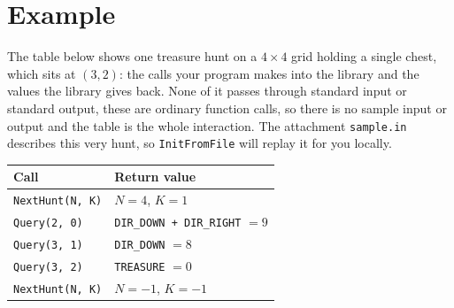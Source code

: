 \section*{Example}
The table below shows one treasure hunt on a $4 \times 4$ grid holding a single
chest, which sits at $(3, 2)$: the calls your program makes into the library and
the values the library gives back. None of it passes through standard input or
standard output, these are ordinary function calls, so there is no sample input or
output and the table is the whole interaction. The attachment \texttt{sample.in}
describes this very hunt, so \texttt{InitFromFile} will replay it for you locally.

\begin{center}
\begin{tabular}{| l | l |}
  \hline
  \textbf{Call} & \textbf{Return value} \\ \hline
  \texttt{NextHunt(N, K)} & $N = 4$, $K = 1$ \\ \hline
  \texttt{Query(2, 0)}    & \texttt{DIR\_DOWN + DIR\_RIGHT} $= 9$ \\ \hline
  \texttt{Query(3, 1)}    & \texttt{DIR\_DOWN} $= 8$ \\ \hline
  \texttt{Query(3, 2)}    & \texttt{TREASURE} $= 0$ \\ \hline
  \texttt{NextHunt(N, K)} & $N = -1$, $K = -1$ \\ \hline
\end{tabular}
\end{center}
